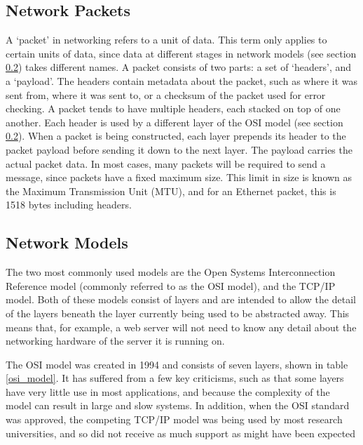 %

\subsection{Network Packets}
\label{network_packets}

A `packet' in networking refers to a unit of data. This term only applies to certain units of data, since data at different stages in network models (see section \ref{network_models}) takes different names. A packet consists of two parts: a set of `headers', and a `payload'. The headers contain metadata about the packet, such as where it was sent from, where it was sent to, or a checksum of the packet used for error checking. A packet tends to have multiple headers, each stacked on top of one another. Each header is used by a different layer of the OSI model (see section \ref{network_models}). When a packet is being constructed, each layer prepends its header to the packet payload before sending it down to the next layer. The payload carries the actual packet data. In most cases, many packets will be required to send a message, since packets have a fixed maximum size. This limit in size is known as the Maximum Transmission Unit (MTU), and for an Ethernet packet, this is 1518 bytes including headers.

\subsection{Network Models}
\label{network_models}
The two most commonly used models are the Open Systems Interconnection Reference model (commonly referred to as the OSI model), and the TCP/IP model. Both of these models consist of layers and are intended to allow the detail of the layers beneath the layer currently being used to be abstracted away. This means that, for example, a web server will not need to know any detail about the networking hardware of the server it is running on.

The OSI model was created in 1994 \cite{iec7498_1_1994} and consists of seven layers, shown in table \ref{osi_model}. It has suffered from a few key criticisms, such as that some layers have very little use in most applications, and because the complexity of the model can result in large and slow systems. In addition, when the OSI standard was approved, the competing TCP/IP model was being used by most research universities, and so did not receive as much support as might have been expected

